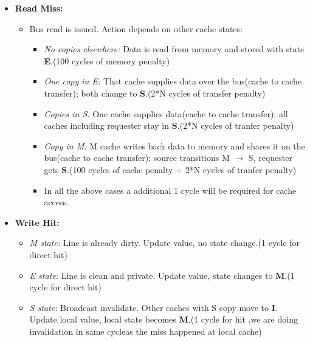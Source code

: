 \documentclass[11pt]{article}
\begin{document}
\begin{itemize}
\begin{itemize}
      \item \textbf{Read Miss:} 
        \begin{itemize}
          \item Bus read is issued. Action depends on other cache states:
          \begin{itemize}
            \item \emph{No copies elsewhere:} Data is read from memory and stored with state \textbf{E}.(100 cycles of memory penalty)
            \item \emph{One copy in E:} That cache supplies data over the bus(cache to cache transfer); both change to \textbf{S}.(2*N cycles of transfer penalty)
            \item \emph{Copies in S:} One cache supplies data(cache to cache transfer); all caches including requester stay in \textbf{S}.(2*N cycles of tranfer penalty)
            \item \emph{Copy in M:} M cache writes back data to memory and shares it on the bus(cache to cache transfer); source transitions M $\rightarrow$ S, requester gets \textbf{S}.(100 cycles of cache penalty + 2*N cycles of tranfer penalty)
            \item In all the above cases a additional 1 cycle will be required for cache access.
          \end{itemize}
        \end{itemize}

      \item \textbf{Write Hit:} 
        \begin{itemize}
          \item \emph{M state:} Line is already dirty. Update value, no state change.(1 cycle for direct hit)
          \item \emph{E state:} Line is clean and private. Update value, state changes to \textbf{M}.(1 cycle for direct hit)
          \item \emph{S state:} Broadcast invalidate. Other caches with S copy move to \textbf{I}. Update local value, local state becomes \textbf{M}.(1 cycle for hit ,we are doing invalidation in same cycleas the miss happened at local cache)
        \end{itemize}


\end{itemize}
\end{itemize}
\end{document}
